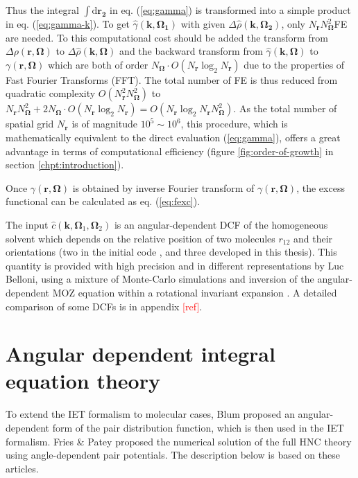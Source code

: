 Thus the integral $\int\mathrm{d}\mathbf{r_{2}}$ in eq. (\ref{eq:gamma})
is transformed into a simple product in eq. (\ref{eq:gamma-k}). To
get $\hat{\gamma}(\mathbf{k},\mathbf{\Omega_{1}})$ with given $\Delta\hat{\rho}(\mathbf{k},\mathbf{\Omega_{2}})$,
only $N_{\mathbf{r}}N_{\mathbf{\Omega}}^{2}$\acs{FE} are needed.
To this computational cost should be added the transform from $\Delta\rho(\mathbf{r},\mathbf{\Omega})$
to $\Delta\hat{\rho}(\mathbf{k},\mathbf{\Omega})$ and the backward
transform from $\hat{\gamma}(\mathbf{k},\mathbf{\Omega})$ to $\gamma(\mathbf{r},\mathbf{\Omega})$
which are both of order $N_{\mathbf{\Omega}}\cdot O(N_{\mathbf{r}}\log_{2}N_{\mathbf{r}})$
due to the properties of Fast Fourier Transforms (\acs{FFT}). The
total number of \acs{FE} is thus reduced from quadratic complexity
$O(N_{\mathbf{r}}^{2}N_{\mathbf{\Omega}}^{2})$ to $N_{\mathbf{r}}N_{\mathbf{\Omega}}^{2}+2N_{\mathbf{\Omega}}\cdot O(N_{\mathbf{r}}\log_{2}N_{\mathbf{r}})=O(N_{\mathbf{r}}\log_{2}N_{\mathbf{r}}N_{\mathbf{\Omega}}^{2})$.
As the total number of spatial grid $N_{\mathbf{r}}$ is of magnitude
$10^{5}\sim10^{6}$, this procedure, which is mathematically equivalent
to the direct evaluation (\ref{eq:gamma}), offers a great advantage
in terms of computational efficiency (figure \ref{fig:order-of-growth}
in section \ref{chpt:introduction}).

Once $\gamma(\mathbf{r},\mathbf{\Omega})$ is obtained by inverse
Fourier transform of $\gamma(\mathbf{r},\mathbf{\Omega})$, the excess
functional can be calculated as eq. (\ref{eq:fexc}).

The input $\hat{c}(\mathbf{k},\mathbf{\Omega}_{1},\mathbf{\Omega}_{2})$
is an angular-dependent \acs{DCF} of the homogeneous solvent which
depends on the relative position of two molecules $r_{12}$ and their
orientations (two in the initial code \citep{Zhao_2011}, and three
developed in this thesis). This quantity is provided with high
precision and in different representations by Luc Belloni, using a
mixture of Monte-Carlo simulations and inversion of the angular-dependent
\acs{MOZ} equation within a rotational invariant expansion \citep{puibasset_bridge_2012}.
A detailed comparison of some \acs{DCF}s is in appendix \textcolor{red}{{[}ref{]}}.

\section{Angular dependent integral equation theory}

To extend the \acs{IET} formalism to molecular cases, Blum \citep{Blum_I,Blum_II}
proposed an angular-dependent form of the pair distribution function,
which is then used in the \acs{IET} formalism. Fries \& Patey \citep{Fries_Patey_1985}
proposed the numerical solution of the full \acs{HNC} theory using
angle-dependent pair potentials. The description below is based on
these articles.

